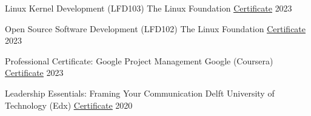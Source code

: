 

\begin{cvhonors}

  \cvhonor
    {Linux Kernel Development (LFD103)} %
    {The Linux Foundation} %
    {\underline{\href{https://ti-user-certificates.s3.amazonaws.com/e0df7fbf-a057-42af-8a1f-590912be5460/7834d4ac-6949-4105-b959-c851d41f5324-muhammad-furqan-cc050c0e-3f78-4faa-b9ad-092122c5d5c9-certificate.pdf}{\faExternalLink* Certificate}}} %
    {2023} %

  \cvhonor
    {Open Source Software Development (LFD102)} %
    {The Linux Foundation} %
    {\underline{\href{https://ti-user-certificates.s3.amazonaws.com/e0df7fbf-a057-42af-8a1f-590912be5460/7834d4ac-6949-4105-b959-c851d41f5324-muhammad-furqan-75314b9f-5987-4a57-8a58-4935940ed5f7-certificate.pdf}{\faExternalLink* Certificate}}} %
    {2023} %

  \cvhonor
    {Professional Certificate: Google Project Management} %
    {Google (Coursera)} %
    {\underline{\href{https://www.coursera.org/account/accomplishments/professional-cert/4Z4V7RJ4XDGQ}{\faExternalLink* Certificate}}} %
    {2023} %

  \cvhonor
    {Leadership Essentials: Framing Your Communication} %
    {Delft University of Technology (Edx)} %
    {\underline{\href{https://courses.edx.org/certificates/0ff36d334bb7485f8ed83c538d352e94}{\faExternalLink* Certificate}}} %
    {2020} %

\end{cvhonors}
